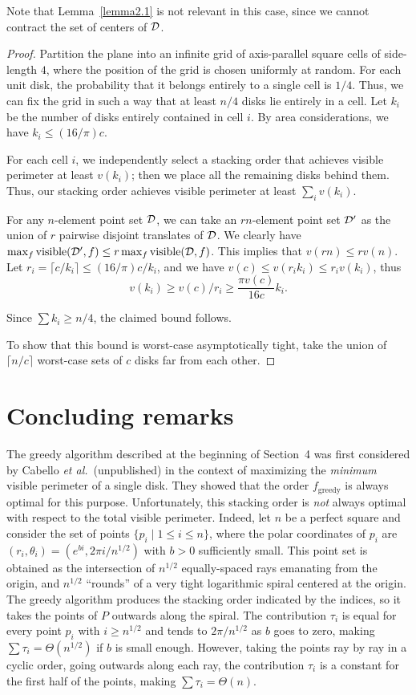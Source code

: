\documentclass[11pt]{article}
\DeclareMathOperator{\vis}{\mathrm{visible}}
\begin{document}
Note that Lemma~\ref{lemma2.1} is not relevant in this case, since we cannot contract the set of centers of ${\cal D}$.

\begin{proof}
Partition the plane into an infinite grid of axis-parallel square cells of side-length $4$, where the position of the grid is chosen uniformly at random. For each unit disk, the probability that it belongs entirely to a single cell is $1/4$. Thus, we
can fix the grid in such a way that at least $n/4$ disks lie entirely in a cell. Let $k_i$ be the number of disks entirely contained in cell $i$. By area considerations, we have $k_i \le (16/\pi)c$.

For each cell $i$, we independently select a stacking order that achieves visible perimeter at least $v(k_i)$; then we place all the remaining disks behind them. Thus, our stacking order achieves visible perimeter at least $\sum_i v(k_i)$.

For any $n$-element point set $\cal D$, we can take an $rn$-element point set
$\cal D'$ as the union of $r$ pairwise disjoint translates of $\cal D$. We
clearly have $\max_f\vis({\cal D}',f)\le r\max_f\vis({\cal D},f)$. This implies that
$v(rn) \le r v(n)$. Let $r_i=\lceil c/k_i\rceil\le(16/\pi)c/k_i$, and we have
$v(c)\le v(r_ik_i)\le r_iv(k_i)$, thus
$$v(k_i)\ge v(c)/r_i\ge\frac{\pi v(c)}{16 c}k_i.$$

Since $\sum k_i \ge n/4$, the claimed bound follows.

To show that this bound is worst-case asymptotically tight, take the union of $\lceil
n/c\rceil$ worst-case sets of $c$ disks far from each other.
\end{proof}

\section{Concluding remarks}

 The greedy algorithm described at the beginning of
Section~4 was first considered by Cabello {\em et al.}\ (unpublished) in the context
of maximizing the \emph{minimum} visible perimeter of a single disk.
They showed that the order $f_{\text{greedy}}$ is always optimal
for this purpose. Unfortunately, this stacking order is \emph{not}
always optimal with respect to the total visible perimeter. Indeed, let $n$ be
a perfect square and consider the set of points $\{p_i\mid1\le i\le n\}$, where
the polar coordinates of $p_i$ are $(r_i, \theta_i) = (e^{bi},2\pi i/n^{1/2})$ with $b>0$
sufficiently small. This point set is obtained as the intersection of
$n^{1/2}$ equally-spaced rays
emanating from the origin, and $n^{1/2}$ ``rounds'' of a very tight
logarithmic spiral centered at the origin. The greedy algorithm produces the
stacking order indicated by the indices, so it takes the
points of $P$ outwards along the spiral. The contribution $\tau_i$ is equal for
every point $p_i$ with $i\ge n^{1/2}$ and tends to $2\pi/n^{1/2}$ as $b$
goes to zero, making
$\sum\tau_i = \Theta(n^{1/2})$ if $b$ is small enough. However, taking the points ray by ray in a cyclic
order, going outwards along each ray, the contribution $\tau_i$ is a constant
for the first half of the points, making $\sum\tau_i = \Theta(n)$.
\end{document}
